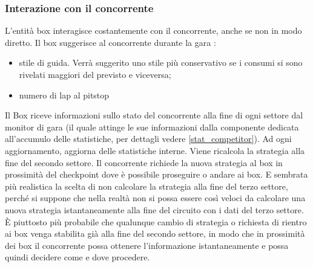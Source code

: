 \subsubsection{Interazione con il concorrente}
L'entità box interagisce costantemente con il concorrente, anche se non in modo
diretto.
Il box suggerisce al concorrente durante la gara :
\begin{itemize}
\item stile di guida. Verrà suggerito uno stile più conservativo se i consumi si
sono rivelati maggiori del previsto e viceversa;
\item numero di lap al pitstop
\end{itemize}
Il Box riceve informazioni sullo stato del concorrente alla fine di ogni settore dal monitor di gara (il quale attinge
le sue informazioni dalla componente dedicata all'accumulo delle statistiche, per dettagli vedere \ref{stat_competitor}).
Ad ogni aggiornamento, aggiorna delle statistiche interne. Viene ricalcola la strategia alla fine del secondo settore. 
Il concorrente richiede
la  nuova strategia al box in prossimità del checkpoint dove è possibile
proseguire o andare ai box.
E sembrata più realistica la scelta di non calcolare la strategia alla fine del
terzo settore, perché si suppone che nella realtà non si possa essere così
veloci da calcolare una nuova strategia istantaneamente alla fine del circuito
con i dati del terzo settore. \`{E} piuttosto più probabile che qualunque cambio
di strategia o richiesta di rientro ai box venga stabilita già alla fine del
secondo settore, in modo che in prossimità dei box il concorrente possa ottenere
l’informazione istantaneamente e possa quindi decidere come e dove procedere.
